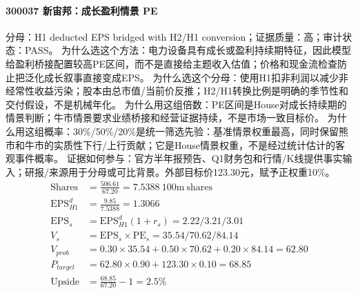 \paragraph{300037 新宙邦：成长盈利情景 PE}
分母：H1 deducted EPS bridged with H2/H1 conversion；证据质量：高；审计状态：PASS。
为什么选这个方法：电力设备具有成长或盈利持续期特征，因此模型给盈利桥接配置较高PE区间，而不是直接给主题收入估值；价格和现金流检查防止把泛化成长叙事直接变成EPS。
为什么选这个分母：使用H1扣非利润以减少非经常性收益污染；股本由总市值/当前价反推；H2/H1转换比例是明确的季节性和交付假设，不是机械年化。
为什么用这组倍数：PE区间是House对成长持续期的情景判断；牛市情景要求业绩桥接和经营证据持续，不是市场一致目标价。
为什么用这组概率：30\%/50\%/20\%是统一筛选先验：基准情景权重最高，同时保留熊市和牛市的实质性下行/上行贡献；它是House情景权重，不是经过统计估计的客观事件概率。
证据如何参与：官方半年报预告、Q1财务包和行情/K线提供事实输入；研报/来源用于分母或可比背景。外部目标价123.30元，赋予正权重10\%。
\begin{align*}
\mathrm{Shares} &= \frac{506.61}{67.20}=7.5388\ \mathrm{100m\ shares}\\
\mathrm{EPS}_{H1}^d &= \frac{9.85}{7.5388}=1.3066\\
\mathrm{EPS}_s &= \mathrm{EPS}_{H1}^d(1+r_s)=2.22/3.21/3.01\\
V_s &= \mathrm{EPS}_s\times \mathrm{PE}_s=35.54/70.62/84.14\\
V_{prob} &= 0.30\times 35.54+0.50\times 70.62+0.20\times 84.14=62.80\\
P_{target} &= 62.80\times 0.90+123.30\times 0.10=68.85\\
\mathrm{Upside} &= \frac{68.85}{67.20}-1=2.5\%\\
\end{align*}

